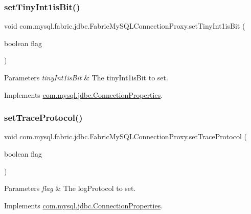 \subsubsection{\texorpdfstring{set\+Tiny\+Int1is\+Bit()}{setTinyInt1isBit()}}
{\footnotesize\ttfamily void com.\+mysql.\+fabric.\+jdbc.\+Fabric\+My\+S\+Q\+L\+Connection\+Proxy.\+set\+Tiny\+Int1is\+Bit (\begin{DoxyParamCaption}\item[{boolean}]{flag }\end{DoxyParamCaption})}


\begin{DoxyParams}{Parameters}
{\em tiny\+Int1is\+Bit} & The tiny\+Int1is\+Bit to set. \\
\hline
\end{DoxyParams}


Implements \mbox{\hyperlink{interfacecom_1_1mysql_1_1jdbc_1_1_connection_properties_ac1fb7af1cc73512dd8dac99bdc7a5602}{com.\+mysql.\+jdbc.\+Connection\+Properties}}.

\mbox{\label{classcom_1_1mysql_1_1fabric_1_1jdbc_1_1_fabric_my_s_q_l_connection_proxy_a52eb83144f87988b4062bccf64d375f7}} 
\subsubsection{\texorpdfstring{set\+Trace\+Protocol()}{setTraceProtocol()}}
{\footnotesize\ttfamily void com.\+mysql.\+fabric.\+jdbc.\+Fabric\+My\+S\+Q\+L\+Connection\+Proxy.\+set\+Trace\+Protocol (\begin{DoxyParamCaption}\item[{boolean}]{flag }\end{DoxyParamCaption})}


\begin{DoxyParams}{Parameters}
{\em flag} & The log\+Protocol to set. \\
\hline
\end{DoxyParams}


Implements \mbox{\hyperlink{interfacecom_1_1mysql_1_1jdbc_1_1_connection_properties_a304661cd6d7b203e033ad219de96e0d7}{com.\+mysql.\+jdbc.\+Connection\+Properties}}.

